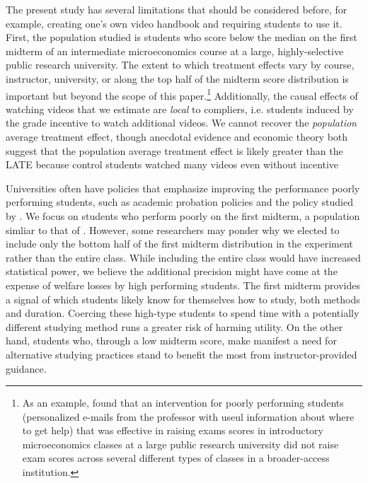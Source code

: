 \documentclass[12pt]{article}
\begin{document}
The present study has several limitations that should be considered before, for example, creating one's own video handbook and requiring students to use it. First, the population studied is students who score below the median on the first midterm of an intermediate microeconomics course at a large, highly-selective public research university. The extent to which treatment effects vary by course, instructor, university, or along the top half of the midterm score distribution is important but beyond the scope of this paper.\footnote{As an example, \textcite{ck2020} found that an intervention for poorly performing students (personalized e-mails from the professor with useul information about where to get help) that was effective in raising exams scores in introductory microeconomics classes at a large public research university did not raise exam scores across several different types of classes in a broader-access institution.} Additionally, the causal effects of watching videos that we estimate are \textit{local} to compliers, i.e. students induced by the grade incentive to watch additional videos. We cannot recover the \textit{population} average treatment effect, though anecdotal evidence and economic theory both suggest that the population average treatment effect is likely greater than the LATE because control students watched many videos even without incentive

Universities often have policies that emphasize improving the performance poorly performing students, such as academic probation policies and the policy studied by \textcite{kow2020}. We focus on students who perform poorly on the first midterm, a population simliar to that of \textcite{dgm2010}. However, some researchers may ponder why we elected to include only the bottom half of the first midterm distribution in the experiment rather than the entire class. While including the entire class would have increased statistical power, we believe the additional precision might have come at the expense of welfare losses by high performing students. The first midterm provides a signal of which students likely know for themselves how to study, both methods and duration. Coercing these high-type students to spend time with a potentially different studying method runs a greater risk of harming utility. On the other hand, students who, through a low midterm score, make manifest a need for alternative studying practices stand to benefit the most from instructor-provided guidance.
\end{document}
